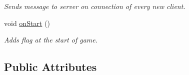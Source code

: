 \begin{DoxyCompactItemize}
\begin{DoxyCompactList}\small\item\em Sends message to server on connection of every new client. \end{DoxyCompactList}\item 
void \hyperlink{class_client_aa9be1e9104a9fe60f89fd727b15a4fd3}{on\+Start} ()\hypertarget{class_client_aa9be1e9104a9fe60f89fd727b15a4fd3}{}\label{class_client_aa9be1e9104a9fe60f89fd727b15a4fd3}

\begin{DoxyCompactList}\small\item\em Adds flag at the start of game. \end{DoxyCompactList}\end{DoxyCompactItemize}
\subsection*{Public Attributes}
